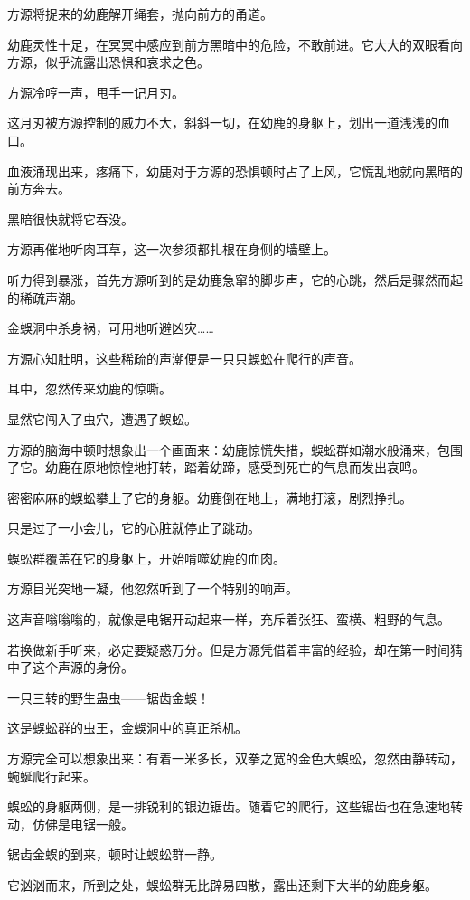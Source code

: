 \begin{this_body}
方源将捉来的幼鹿解开绳套，抛向前方的甬道。

幼鹿灵性十足，在冥冥中感应到前方黑暗中的危险，不敢前进。它大大的双眼看向方源，似乎流露出恐惧和哀求之色。

方源冷哼一声，甩手一记月刃。

这月刃被方源控制的威力不大，斜斜一切，在幼鹿的身躯上，划出一道浅浅的血口。

血液涌现出来，疼痛下，幼鹿对于方源的恐惧顿时占了上风，它慌乱地就向黑暗的前方奔去。

黑暗很快就将它吞没。

方源再催地听肉耳草，这一次参须都扎根在身侧的墙壁上。

听力得到暴涨，首先方源听到的是幼鹿急窜的脚步声，它的心跳，然后是骤然而起的稀疏声潮。

金蜈洞中杀身祸，可用地听避凶灾……

方源心知肚明，这些稀疏的声潮便是一只只蜈蚣在爬行的声音。

耳中，忽然传来幼鹿的惊嘶。

显然它闯入了虫穴，遭遇了蜈蚣。

方源的脑海中顿时想象出一个画面来：幼鹿惊慌失措，蜈蚣群如潮水般涌来，包围了它。幼鹿在原地惊惶地打转，踏着幼蹄，感受到死亡的气息而发出哀鸣。

密密麻麻的蜈蚣攀上了它的身躯。幼鹿倒在地上，满地打滚，剧烈挣扎。

只是过了一小会儿，它的心脏就停止了跳动。

蜈蚣群覆盖在它的身躯上，开始啃噬幼鹿的血肉。

方源目光突地一凝，他忽然听到了一个特别的响声。

这声音嗡嗡嗡的，就像是电锯开动起来一样，充斥着张狂、蛮横、粗野的气息。

若换做新手听来，必定要疑惑万分。但是方源凭借着丰富的经验，却在第一时间猜中了这个声源的身份。

一只三转的野生蛊虫——锯齿金蜈！

这是蜈蚣群的虫王，金蜈洞中的真正杀机。

方源完全可以想象出来：有着一米多长，双拳之宽的金色大蜈蚣，忽然由静转动，蜿蜒爬行起来。

蜈蚣的身躯两侧，是一排锐利的银边锯齿。随着它的爬行，这些锯齿也在急速地转动，仿佛是电锯一般。

锯齿金蜈的到来，顿时让蜈蚣群一静。

它汹汹而来，所到之处，蜈蚣群无比辟易四散，露出还剩下大半的幼鹿身躯。


\end{this_body}
